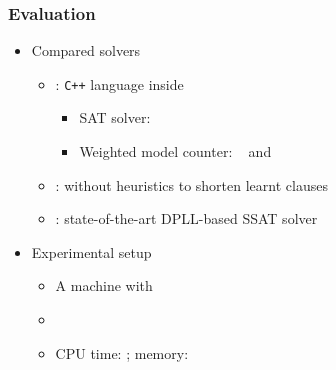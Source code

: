 \renewcommand{\nrandom}{\num{700}}
\renewcommand{\napplication}{\num{212}}
\newcommand{\ntoilet}{\num{77}}
\newcommand{\nmaxcount}{\num{26}}
\newcommand{\nsandcastle}{\num{25}}
\newcommand{\nconformant}{\num{24}}
\newcommand{\nmpec}{\num{60}}

\begin{frame}
    \frametitle{Evaluation}
    \begin{itemize}
        \item Compared solvers
              \pause
              \begin{itemize}
                  \item \erssat: \texttt{C++} language inside~\abc~\cite{ABC}
                        \pause
                        \begin{itemize}
                            \item SAT solver: ~\cite{Een2003Solver}
                                  \pause
                            \item Weighted model counter: \cachet~\cite{Sang2004} and \cudd~\cite{Darwiche2002KnowledgeCompilation}
                                  \pause
                        \end{itemize}
                  \item \erssatb: \erssat without heuristics to shorten learnt clauses
                        \pause
                  \item \dcssat: state-of-the-art DPLL-based SSAT solver
                        \pause
              \end{itemize}
        \item Experimental setup
              \pause
              \begin{itemize}
                  \item A machine with~\machineSpec
                        \pause
                  \item \osInfo
                        \pause
                  \item CPU time: \timelimit; memory: \memlimit
              \end{itemize}
    \end{itemize}
\end{frame}


